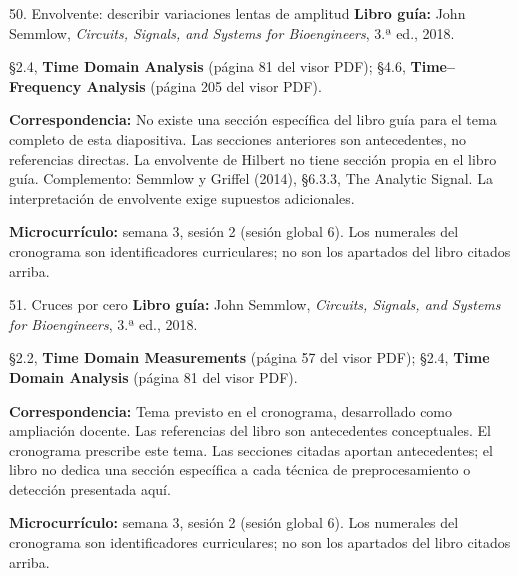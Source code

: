 \documentclass[
  10pt,
  ignorenonframetext,
  aspectratio=169,
  spanish,
]{beamer}
\begin{document}
\begin{frame}{50. Envolvente: describir variaciones lentas de amplitud}
\label{envolvente-describir-variaciones-lentas-de-amplitud}
\textbf{Libro guía:} John Semmlow, \emph{Circuits, Signals, and Systems
for Bioengineers}, 3.ª ed., 2018.

§2.4, \textbf{Time Domain Analysis} (página 81 del visor PDF); §4.6,
\textbf{Time--Frequency Analysis} (página 205 del visor PDF).

\textbf{Correspondencia:} No existe una sección específica del libro
guía para el tema completo de esta diapositiva. Las secciones anteriores
son antecedentes, no referencias directas. La envolvente de Hilbert no
tiene sección propia en el libro guía. Complemento: Semmlow y Griffel
(2014), §6.3.3, The Analytic Signal. La interpretación de envolvente
exige supuestos adicionales.

\textbf{Microcurrículo:} semana 3, sesión 2 (sesión global 6). Los
numerales del cronograma son identificadores curriculares; no son los
apartados del libro citados arriba.
\end{frame}

\begin{frame}{51. Cruces por cero}
\label{cruces-por-cero}
\textbf{Libro guía:} John Semmlow, \emph{Circuits, Signals, and Systems
for Bioengineers}, 3.ª ed., 2018.

§2.2, \textbf{Time Domain Measurements} (página 57 del visor PDF); §2.4,
\textbf{Time Domain Analysis} (página 81 del visor PDF).

\textbf{Correspondencia:} Tema previsto en el cronograma, desarrollado
como ampliación docente. Las referencias del libro son antecedentes
conceptuales. El cronograma prescribe este tema. Las secciones citadas
aportan antecedentes; el libro no dedica una sección específica a cada
técnica de preprocesamiento o detección presentada aquí.

\textbf{Microcurrículo:} semana 3, sesión 2 (sesión global 6). Los
numerales del cronograma son identificadores curriculares; no son los
apartados del libro citados arriba.
\end{frame}
\end{document}
